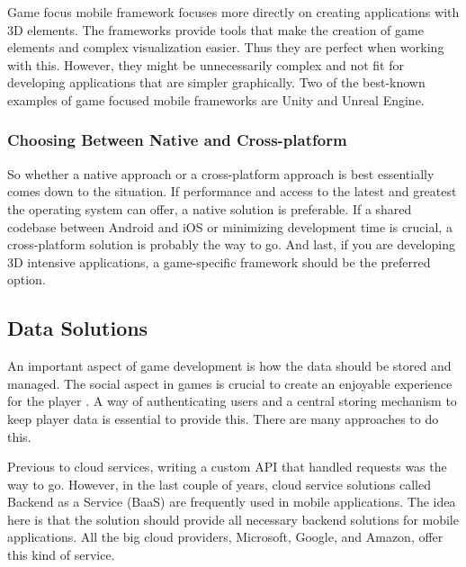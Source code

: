 \documentclass[../Main.tex]{subfiles}
\begin{document}
Game focus mobile framework focuses more directly on creating applications with 3D elements. The frameworks provide tools that make the creation of game elements and complex visualization easier. Thus they are perfect when working with this. However, they might be unnecessarily complex and not fit for developing applications that are simpler graphically. Two of the best-known examples of game focused mobile frameworks are Unity and Unreal Engine.


\subsubsection{Choosing Between Native and Cross-platform}
So whether a native approach or a cross-platform approach is best essentially comes down to the situation. If performance and access to the latest and greatest the operating system can offer, a native solution is preferable. If a shared codebase between Android and iOS or minimizing development time is crucial, a cross-platform solution is probably the way to go. And last, if you are developing 3D intensive applications, a game-specific framework should be the preferred option.

\subsection{Data Solutions}
An important aspect of game development is how the data should be stored and managed. The social aspect in games is crucial to create an enjoyable experience for the player \citep{sweetser_gameflow_2005}. A way of authenticating users and a central storing mechanism to keep player data is essential to provide this. There are many approaches to do this. 

Previous to cloud services, writing a custom API that handled requests was the way to go. However, in the last couple of years, cloud service solutions called Backend as a Service (BaaS) are frequently used in mobile applications. The idea here is that the solution should provide all necessary backend solutions for mobile applications. All the big cloud providers, Microsoft, Google, and Amazon, offer this kind of service.
\end{document}
